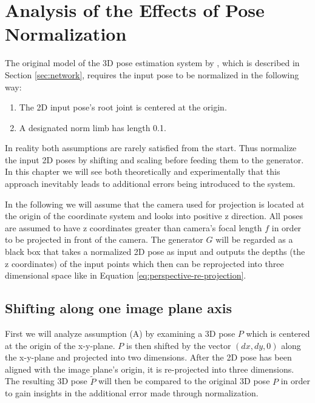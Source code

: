 \section{Analysis of the Effects of Pose Normalization}

The original model of the 3D pose estimation system by \citet{drover18}, which is described in Section \ref{sec:network}, requires the input pose to be normalized in the following way:
\begin{enumerate}[label=(\Alph*)]
	\item The 2D input pose's root joint is centered at the origin.
	\item A designated norm limb has length 0.1.
\end{enumerate}

In reality both assumptions are rarely satisfied from the start.
Thus \citet{drover18} normalize the input 2D poses by shifting and scaling before feeding them to the generator.
In this chapter we will see both theoretically and experimentally that this approach inevitably leads to additional errors being introduced to the system.


In the following we will assume that the camera used for projection is located at the origin of the coordinate system and looks into positive z direction.
All poses are assumed to have z coordinates greater than camera's focal length $f$ in order to be projected in front of the camera.
The generator $G$ will be regarded as a black box that takes a normalized 2D pose as input and outputs the depths (the z coordinates) of the input points which then can be reprojected into three dimensional space like in Equation \eqref{eq:perspective-re-projection}.


\subsection{Shifting along one image plane axis}
\label{sec:x-shift-error}
First we will analyze assumption (A) by examining a 3D pose $P$ which is centered at the origin of the x-y-plane.
$P$ is then shifted by the vector $(dx, dy, 0)$ along the x-y-plane and projected into two dimensions.
After the 2D pose has been aligned with the image plane's origin, it is re-projected into three dimensions.
The resulting 3D pose $\widetilde{P}$ will then be compared to the original 3D pose $P$ in order to gain insights in the additional error made through normalization.

